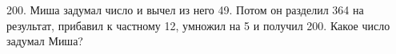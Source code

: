 200. Миша задумал число и вычел из него 49. Потом он разделил 364 на результат, прибавил к частному 12, умножил на 5 и получил 200. Какое число задумал Миша?\\
